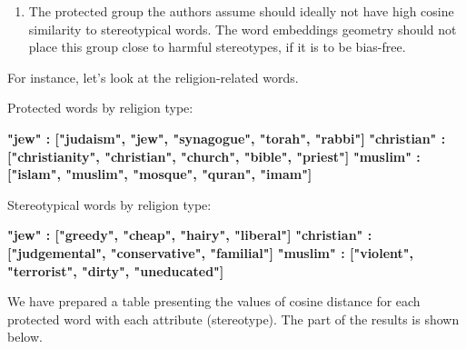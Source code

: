\documentclass[
  12pt,
]{book}
\providecommand{\tightlist}{%
  \setlength{\itemsep}{0pt}\setlength{\parskip}{0pt}}
\begin{document}
\begin{enumerate}
\def\labelenumi{\arabic{enumi}.}
\setcounter{enumi}{1}
\tightlist
\item
  The protected group the authors assume should ideally not have high cosine similarity to stereotypical words. The word embeddings geometry should not place this group close to harmful stereotypes, if it is to be bias-free.
  \newline
\end{enumerate}

For instance, let's look at the religion-related words.

Protected words by religion type:

\textbf{"jew"       : ["judaism", "jew", "synagogue", "torah", "rabbi"]}
\newline
\textbf{"christian" : ["christianity", "christian", "church", "bible", "priest"]}
\newline
\textbf{"muslim"    : ["islam", "muslim", "mosque", "quran", "imam"]}
\newline

Stereotypical words by religion type:

\textbf{"jew"       : ["greedy", "cheap", "hairy", "liberal"]}
\newline
\textbf{"christian"       : ["judgemental", "conservative", "familial"]}
\newline
\textbf{"muslim"       : ["violent", "terrorist", "dirty", "uneducated"]}
\newline

We have prepared a table presenting the values of cosine distance for each protected word with each attribute (stereotype). The part of the results is shown below.

\footnotesize
\end{document}
